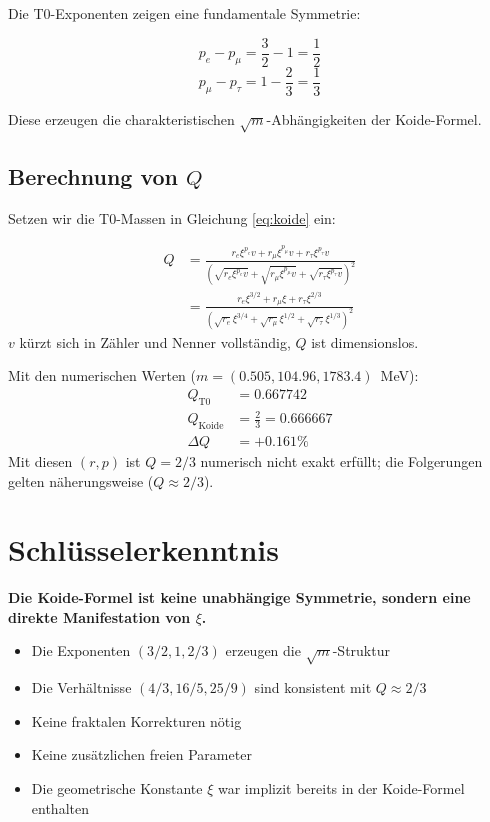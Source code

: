 	Die T0-Exponenten zeigen eine fundamentale Symmetrie:
	
	\begin{equation}
		p_e - p_\mu = \frac{3}{2} - 1 = \frac{1}{2}
	\end{equation}
	\begin{equation}
		p_\mu - p_\tau = 1 - \frac{2}{3} = \frac{1}{3}
	\end{equation}
	
	Diese erzeugen die charakteristischen $\sqrt{m}$-Abhängigkeiten der Koide-Formel.
	
	\subsection{Berechnung von $Q$}
	
	Setzen wir die T0-Massen in Gleichung \eqref{eq:koide} ein:
	
	\begin{align}
		Q &= \frac{r_e \xi^{p_e} v + r_\mu \xi^{p_\mu} v + r_\tau \xi^{p_\tau} v}{\left(\sqrt{r_e \xi^{p_e} v} + \sqrt{r_\mu \xi^{p_\mu} v} + \sqrt{r_\tau \xi^{p_\tau} v}\right)^2} \\
		&= \frac{r_e \xi^{3/2} + r_\mu \xi + r_\tau \xi^{2/3}}{\left(\sqrt{r_e} \xi^{3/4} + \sqrt{r_\mu} \xi^{1/2} + \sqrt{r_\tau} \xi^{1/3}\right)^2}
	\end{align}
	$v$ kürzt sich in Zähler und Nenner vollständig, $Q$ ist dimensionslos.
	
	Mit den numerischen Werten ($m = (0.505, 104.96, 1783.4)$~MeV):
	\begin{align}
		Q_{\text{T0}} &= 0.667742 \\
		Q_{\text{Koide}} &= \frac{2}{3} = 0.666667 \\
		\Delta Q &= +0.161\%
	\end{align}
	Mit diesen $(r,p)$ ist $Q = 2/3$ numerisch nicht exakt erfüllt; die Folgerungen gelten näherungsweise ($Q \approx 2/3$).
	
	\section{Schlüsselerkenntnis}
	
	\begin{folgerung}
		\textbf{Die Koide-Formel ist keine unabhängige Symmetrie, sondern eine direkte Manifestation von $\xi$.}
		
		\begin{itemize}
			\item Die Exponenten $(3/2, 1, 2/3)$ erzeugen die $\sqrt{m}$-Struktur
			\item Die Verhältnisse $(4/3, 16/5, 25/9)$ sind konsistent mit $Q \approx 2/3$
			\item Keine fraktalen Korrekturen nötig
			\item Keine zusätzlichen freien Parameter
			\item Die geometrische Konstante $\xi$ war implizit bereits in der Koide-Formel enthalten
		\end{itemize}
	\end{folgerung}
	
